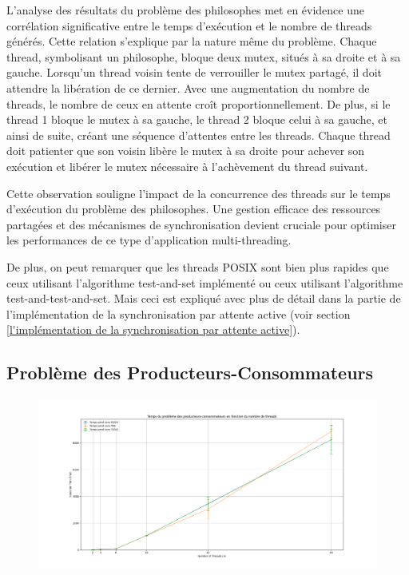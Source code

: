 \documentclass[12pt,titlepage]{article}
\begin{document}
L'analyse des résultats du problème des philosophes met en évidence une corrélation significative entre le temps d'exécution et le nombre de threads générés. Cette relation s'explique par la nature même du problème. Chaque thread, symbolisant un philosophe, bloque deux mutex, situés à sa droite et à sa gauche. Lorsqu'un thread voisin tente de verrouiller le mutex partagé, il doit attendre la libération de ce dernier. Avec une augmentation du nombre de threads, le nombre de ceux en attente croît proportionnellement. De plus, si le thread 1 bloque le mutex à sa gauche, le thread 2 bloque celui à sa gauche, et ainsi de suite, créant une séquence d'attentes entre les threads. Chaque thread doit patienter que son voisin libère le mutex à sa droite pour achever son exécution et libérer le mutex nécessaire à l'achèvement du thread suivant.

Cette observation souligne l'impact de la concurrence des threads sur le temps d'exécution du problème des philosophes. Une gestion efficace des ressources partagées et des mécanismes de synchronisation devient cruciale pour optimiser les performances de ce type d'application multi-threading.

De plus, on peut remarquer que les threads POSIX sont bien plus rapides que ceux utilisant l'algorithme test-and-set implémenté ou ceux utilisant l'algorithme test-and-test-and-set. Mais ceci est expliqué avec plus de détail dans la partie de l'implémentation de la synchronisation par attente active (voir section \ref{l'implémentation de la synchronisation par attente active}).

\subsection{Problème des Producteurs-Consommateurs}

\begin{figure}[H]
\includegraphics[width=\textwidth, keepaspectratio]{Temps_prod_cons.png}
\centering
\end{figure}
\end{document}
